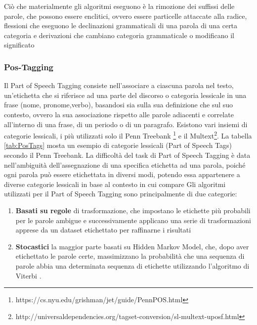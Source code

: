  Ciò che materialmente gli algoritmi eseguono è la rimozione dei suffissi delle parole, che possono essere enclitici, ovvero essere particelle attaccate alla radice, flessioni che eseguono le declinazioni grammaticali di una parola di una certa categoria e derivazioni che cambiano categoria grammaticale o modificano il significato  

\subsubsection{Pos-Tagging}
 
Il Part of Speech Tagging consiste nell'associare a ciascuna parola nel testo, un'etichetta che si riferisce ad una parte del discorso o categoria lessicale in una frase (nome, pronome,verbo), basandosi sia sulla sua definizione che sul  suo contesto, ovvero la sua associazione rispetto alle parole adiacenti e correlate all'interno di una frase, di un periodo o di un paragrafo.
Esistono vari insiemi di categorie lessicali, i più utilizzati solo il Penn Treebank \footnote{https://cs.nyu.edu/grishman/jet/guide/PennPOS.html} e il Multext\footnote{http://universaldependencies.org/tagset-conversion/sl-multext-uposf.html}.
La tabella \ref{tab:PosTags} mosta un esempio di categorie lessicali (Part of Speech Tags) secondo il Penn Treebank.
La difficoltà del task di Part of Speech Tagging è data nell'ambiguità dell'assegnazione di una specifica etichetta ad una parola, poiché ogni parola può essere
etichettata in diversi modi, potendo essa appartenere a diverse categorie lessicali in base al contesto in cui compare 
Gli algoritmi utilizzati per il Part of Speech Tagging sono principalmente di due
categorie:
\begin{enumerate}
\item \textbf{Basati su regole}  di trasformazione, che impostano le etichette più probabili
per le parole ambigue e successivamente applicano una serie di trasformazioni
apprese da un dataset etichettato per raffinarne i risultati 
\item \textbf{Stocastici} la maggior parte basati su Hidden Markov Model,
che, dopo aver etichettato le parole certe, massimizzano la probabilità che una sequenza di parole abbia una determinata sequenza di etichette utilizzando l'algoritmo di Viterbi \cite{Ryan:1993:VA:901051}.
\end{enumerate}

